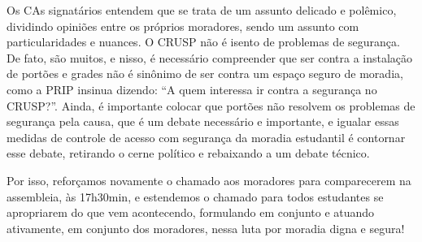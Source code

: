 Os CAs signatários entendem que se trata de um assunto delicado e polêmico, dividindo opiniões entre os próprios moradores, sendo um assunto com particularidades e nuances. O CRUSP não é isento de problemas de segurança. De fato, são muitos, e nisso, é necessário compreender que ser contra a instalação de portões e grades não é sinônimo de ser contra um espaço seguro de moradia, como a PRIP insinua dizendo: “A quem interessa ir contra a segurança no CRUSP?”. Ainda, é importante colocar que portões não resolvem os problemas de segurança pela causa, que é um debate necessário e importante, e igualar essas medidas de controle de acesso com segurança da moradia estudantil é contornar esse debate, retirando o cerne político e rebaixando a um debate técnico.

Por isso, reforçamos novamente o chamado aos moradores para comparecerem na assembleia, às 17h30min, e estendemos o chamado para todos estudantes se apropriarem do que vem acontecendo, formulando em conjunto e atuando ativamente, em conjunto dos moradores, nessa luta por moradia digna e segura!

